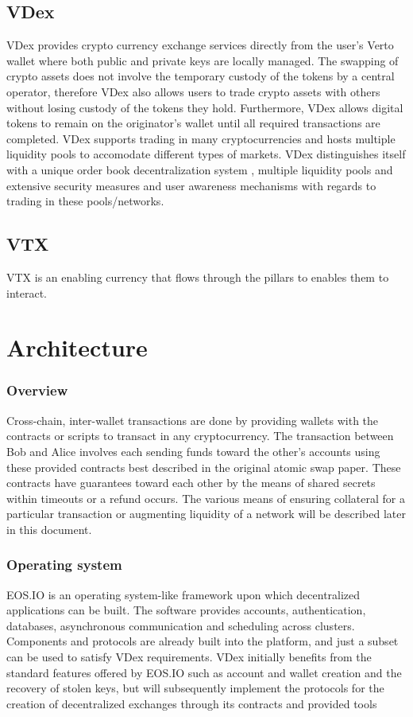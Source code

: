 \documentclass[]{article}
\begin{document}
\subsection {VDex}

VDex provides crypto currency exchange services directly from the user's Verto wallet where both public and private keys are locally managed.
The swapping of crypto assets does not involve the temporary custody of the tokens by a central operator, 
therefore VDex also allows users to trade crypto assets with others without losing custody of the tokens they hold. 
Furthermore, VDex allows digital tokens to remain on the originator's wallet until all required transactions are completed. 
VDex supports trading in many cryptocurrencies and hosts multiple liquidity pools to accomodate different types of markets.
VDex distinguishes itself with a unique order book decentralization system
, multiple liquidity pools and extensive security measures and user awareness mechanisms with regards to trading in these pools/networks.

\subsection {VTX}
VTX is an enabling currency that flows through the pillars to enables them to interact.

									
\section{Architecture}
	
	\subsubsection{Overview}
	Cross-chain, inter-wallet transactions are done by providing wallets with the contracts or scripts to transact in any cryptocurrency. 
	The transaction between Bob and Alice involves each sending funds toward the other's accounts 
	using these provided contracts best described in the original atomic swap paper.\cite{22} 
	These contracts have guarantees toward each other by the means of shared secrets within timeouts or a refund occurs. 
	The various means of ensuring collateral for a particular transaction or augmenting liquidity of a network 
	will be described later in this document.
  
	\subsubsection{Operating system}
	EOS.IO is an operating system-like framework upon which decentralized applications can be built. 
	The software provides accounts, authentication, databases, asynchronous communication and scheduling across clusters. 
	Components and protocols are already built into the platform, and just a subset can be used to satisfy VDex requirements. 
	VDex initially benefits from the standard features offered by EOS.IO such as account and wallet creation 
	and the recovery of stolen keys, but will subsequently implement the protocols 
	for the creation of decentralized exchanges through its contracts and provided tools	\cite{3}\\
  
\end{document}
